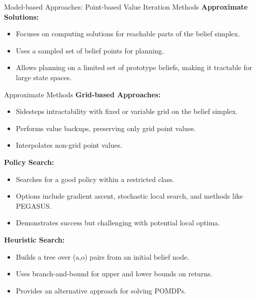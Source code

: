 \documentclass[presentation, smaller]{beamer}
\begin{document}
\begin{frame}{Model-based Approaches: Point-based Value Iteration Methods}
  \textbf{Approximate Solutions:}
  \begin{itemize}
    \item Focuses on computing solutions for reachable parts of the belief simplex.
    \item Uses a sampled set of belief points for planning.
    \item Allows planning on a limited set of prototype beliefs, making it tractable for large state spaces.
  \end{itemize}
\end{frame}


\begin{frame}{Approximate Methods}
  \textbf{Grid-based Approaches:}
  \begin{itemize}
    \item Sidesteps intractability with fixed or variable grid on the belief simplex.
    \item Performs value backups, preserving only grid point values.
    \item Interpolates non-grid point values.
  \end{itemize}

  \textbf{Policy Search:}
  \begin{itemize}
    \item Searches for a good policy within a restricted class.
    \item Options include gradient ascent, stochastic local search, and methods like PEGASUS.
    \item Demonstrates success but challenging with potential local optima.
  \end{itemize}

  \textbf{Heuristic Search:}
  \begin{itemize}
    \item Builds a tree over (a,o) pairs from an initial belief node.
    \item Uses branch-and-bound for upper and lower bounds on returns.
    \item Provides an alternative approach for solving POMDPs.
  \end{itemize}
\end{frame}
\end{document}
